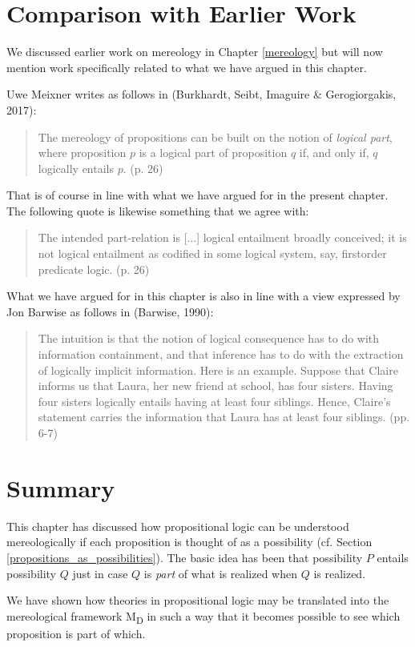 \documentclass[12pt]{book}
\begin{document}
\section{Comparison with Earlier Work}
We discussed earlier work on mereology in Chapter \ref{mereology} but will now mention work specifically related to what we have argued in this chapter.

Uwe Meixner writes as follows in (Burkhardt, Seibt, Imaguire \& Gerogiorgakis, 2017):
\begin{quote}
The mereology of propositions can
be built on the notion of \textit{logical part},
where proposition $p$ is a logical part
of proposition $q$ if, and only if, $q$ logically entails $p$. (p. 26)
\end{quote}

That is of course in line with what we have argued for in the present chapter. The following quote is likewise something that we agree with:
\begin{quote}
The intended part-relation is [...]
logical entailment broadly conceived;
it is not logical entailment as codified
in some logical system, say, firstorder predicate logic. (p. 26)
\end{quote}

What we have argued for in this chapter is also in line with a view expressed by Jon Barwise as follows in (Barwise, 1990):
\begin{quote}
The intuition is that the notion of logical consequence has to
do with information containment, and that inference has to do with the
extraction of logically implicit information. Here is an example. Suppose
that Claire informs us that Laura, her new friend at school, has four sisters.
Having four sisters logically entails having at least four siblings. Hence,
Claire’s statement carries the information that Laura has at least four
siblings. (pp. 6-7)
\end{quote}

\section{Summary}
This chapter has discussed how propositional logic can be understood mereologically if each proposition is thought of as a possibility (cf. Section \ref{propositions_as_possibilities}). The basic idea has been that possibility $P$ entails possibility $Q$ just in case $Q$ is \textit{part} of what is realized when $Q$ is realized.

We have shown how theories in propositional logic may be translated into the mereological framework M\textsubscript{D} in such a way that it becomes possible to see which proposition is part of which.
\end{document}
